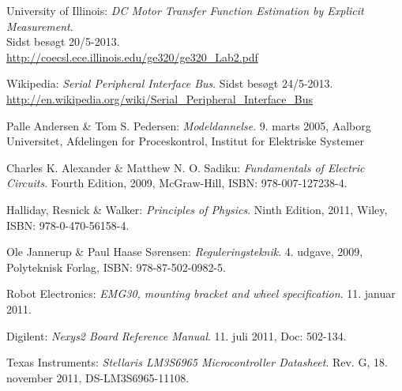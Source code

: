 \documentclass[rapport.tex]{subfiles}
\begin{document}
\renewcommand{\bibname}{Litteraturliste}		%

\begin{thebibliography}{99}

	University of Illinois:
	\emph{DC Motor Transfer Function Estimation by Explicit Measurement}.\\ Sidst besøgt 20/5-2013.\\
	\url{http://coecsl.ece.illinois.edu/ge320/ge320_Lab2.pdf}
	
	Wikipedia:
	\emph{Serial Peripheral Interface Bus}. Sidst besøgt 24/5-2013.\\
	\url{http://en.wikipedia.org/wiki/Serial_Peripheral_Interface_Bus}

	Palle Andersen \& Tom S. Pedersen:
	\emph{Modeldannelse}.
	9. marts 2005,
	Aalborg Universitet,
	Afdelingen for Proceskontrol, Institut for Elektriske Systemer
	
	Charles K. Alexander \& Matthew N. O. Sadiku:
	\emph{Fundamentals of Electric Circuits}.
	Fourth Edition,
	2009,
	McGraw-Hill,
	ISBN: 978-007-127238-4.

	Halliday, Resnick \& Walker:
	\emph{Principles of Physics}.
	Ninth Edition,
	2011,
	Wiley,
	ISBN: 978-0-470-56158-4.

	Ole Jannerup \& Paul Haase Sørensen:
	\emph{Reguleringsteknik}.
	4. udgave,
	2009,
	Polyteknisk Forlag,
	ISBN: 978-87-502-0982-5.
	
	Robot Electronics:
	\emph{EMG30, mounting bracket and wheel specification}.
	11. januar 2011.

	Digilent:
	\emph{Nexys2 Board Reference Manual}.
	11. juli 2011,
	Doc: 502-134.

	Texas Instruments:
	\emph{Stellaris LM3S6965 Microcontroller Datasheet}.
	Rev. G,
	18. november 2011,
	DS-LM3S6965-11108.



\end{thebibliography}
\end{document}

